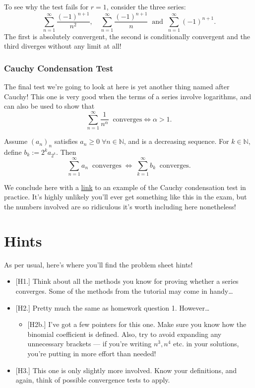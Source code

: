 \documentclass[
  10pt,
  a4paper]{article}
\providecommand{\tightlist}{%
  \setlength{\itemsep}{0pt}\setlength{\parskip}{0pt}}
\theoremstyle{plain}
\theoremstyle{plain}
\theoremstyle{plain}
\theoremstyle{plain}
\theoremstyle{plain}
\theoremstyle{definition}
\theoremstyle{definition}
\theoremstyle{definition}
\theoremstyle{remark}
\let\BeginKnitrBlock\begin \let\EndKnitrBlock\end
\begin{document}
To see why the test fails for \(r = 1\), consider the three series: \[\sum_{n = 1}^{\infty} \frac{(-1)^{n+1}}{n^2}, \quad \sum_{n = 1}^{\infty} \frac{(-1)^{n+1}}{n} \;\; \text{and} \;\; \sum_{n = 1}^{\infty} (-1)^{n+1}.\] The first is absolutely convergent, the second is conditionally convergent and the third diverges without any limit at all!

\hypertarget{cauchy-condensation-test}{%
\subsubsection{Cauchy Condensation Test}\label{cauchy-condensation-test}}

The final test we're going to look at here is yet another thing named after Cauchy! This one is very good when the terms of a series involve logarithms, and can also be used to show that \[\sum_{n = 1}^{\infty} \frac{1}{n^{\alpha}} \;\;\text{converges} \Longleftrightarrow \alpha > 1.\]

\BeginKnitrBlock{theorem}[Cauchy]
{\label{thm:thm5} }Assume \((a_n)_n\) satisfies \(a_n \geq 0 \; \forall n \in \mathbb{N}\), and is a decreasing sequence. For \(k \in \mathbb{N}\), define \(b_k := 2^ka_{2^k}\). Then \[\sum_{n = 1}^{\infty} a_n \;\; \text{converges}\; \Longleftrightarrow\; \sum_{k = 1}^{\infty} b_k \;\; \text{converges}.\]
\EndKnitrBlock{theorem}

We conclude here with a \href{https://math.stackexchange.com/questions/2071016/does-sum-infty-3-fracn2lnlnnlnn-converge?rq=1}{link} to an example of the Cauchy condensation test in practice. It's highly unlikely you'll ever get something like this in the exam, but the numbers involved are so ridiculous it's worth including here nonetheless!

\hypertarget{hints}{%
\section{Hints}\label{hints}}

As per usual, here's where you'll find the problem sheet hints!

\begin{itemize}
\tightlist
\item
  {[}H1.{]} Think about all the methods you know for proving whether a series converges. Some of the methods from the tutorial may come in handy\ldots{}
\item
  {[}H2.{]} Pretty much the same as homework question 1. However\ldots{}

  \begin{itemize}
  \tightlist
  \item
    {[}H2b.{]} I've got a few pointers for this one. Make sure you know how the binomial coefficient is defined. Also, try to avoid expanding any unnecessary brackets --- if you're writing \(n^3, n^4\) etc. in your solutions, you're putting in more effort than needed!
  \end{itemize}
\item
  {[}H3.{]} This one is only slightly more involved. Know your definitions, and again, think of possible convergence tests to apply.
\end{itemize}
\end{document}
